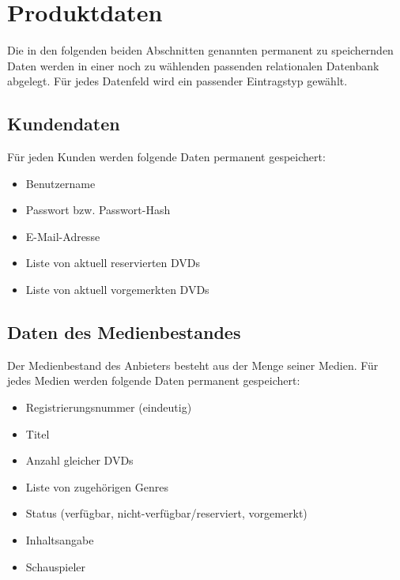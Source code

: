 \documentclass[12pt,oneside,a4paper,bibtotoc,liststotoc,pointlessnumbers]{scrartcl}
\begin{document}
\section{Produktdaten}
Die in den folgenden beiden Abschnitten genannten permanent zu speichernden Daten werden in einer noch zu wählenden passenden relationalen Datenbank abgelegt. Für jedes Datenfeld wird ein passender Eintragstyp gewählt.
\subsection{Kundendaten}
Für jeden Kunden werden folgende Daten permanent gespeichert:
\begin{itemize}
\item Benutzername
\item Passwort bzw. Passwort-Hash
\item E-Mail-Adresse
\item Liste von aktuell reservierten DVDs
\item Liste von aktuell vorgemerkten DVDs
\end{itemize}

\subsection{Daten des Medienbestandes}
Der Medienbestand des Anbieters besteht aus der Menge seiner Medien. Für jedes Medien werden folgende Daten permanent gespeichert:
\begin{itemize}
\item Registrierungsnummer (eindeutig)
\item Titel
\item Anzahl gleicher DVDs
\item Liste von zugehörigen Genres
\item Status (verfügbar, nicht-verfügbar/reserviert, vorgemerkt)
\item Inhaltsangabe
\item Schauspieler
\end{itemize}

\newpage
\end{document}

